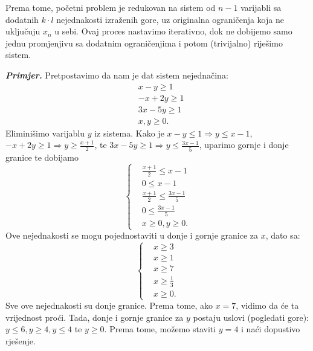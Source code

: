 \documentclass[a4paper, utf8, 11pt, colorlinks]{book}
\begin{document}
Prema tome, početni problem je redukovan na sistem od $n-1$ varijabli sa dodatnih  $k \cdot l$ nejednakosti izraženih gore, uz originalna ograničenja koja ne uključuju $x_n$ u sebi. Ovaj proces nastavimo iterativno, dok ne dobijemo samo jednu promjenjivu sa dodatnim ograničenjima  i potom (trivijalno) riješimo sistem. 

\emph{\textbf{Primjer.}} Pretpostavimo da nam je dat sistem nejednačina:
\begin{align*}
	 &x - y \geq 1 \\
	 &-x + 2y \geq 1 \\
	 & 3x - 5y \geq 1 \\
	 & x,y \geq 0.
\end{align*}
Eliminišimo varijablu $y$ iz sistema. Kako je $x-y \leq 1 \Rightarrow y \leq x -1 $, 
$-x + 2y \geq 1 \Rightarrow y \geq \frac{x+1}{2}$, te $ 3x - 5y \geq 1 \Rightarrow y \leq \frac{3x-1}{5}$, uparimo gornje i donje granice te dobijamo 
 $$
 \begin{cases}
 	&\frac{x+1}{2} \leq x-1 \\
 	& 0 \leq x-1 \\
 	& \frac{x+1}{2} \leq \frac{3x-1}{5} \\
 	& 0 \leq \frac{3x-1}{5} \\
 	& x \geq 0, y \geq 0.  	
 \end{cases}
 $$
Ove nejednakosti se mogu pojednostaviti u donje i gornje granice za $x$, dato sa:
$$
\begin{cases}
    &x \geq 3 \\
    & x \geq 1 \\
    & x \geq 7 \\
    & x \geq \frac{1}{3} \\
    & x \geq 0.	
\end{cases}
$$
Sve ove nejednakosti su donje granice. Prema tome, ako $x=7$, vidimo da će ta vrijednost proći. 
Tada, donje i gornje granice za $y$ postaju uslovi (pogledati gore): $y \leq 6, y \geq 4, y \leq 4$ te $y \geq 0$. Prema tome, možemo staviti $y=4$ i naći dopustivo rješenje. 

\vspace{1.5cm}
\end{document}
